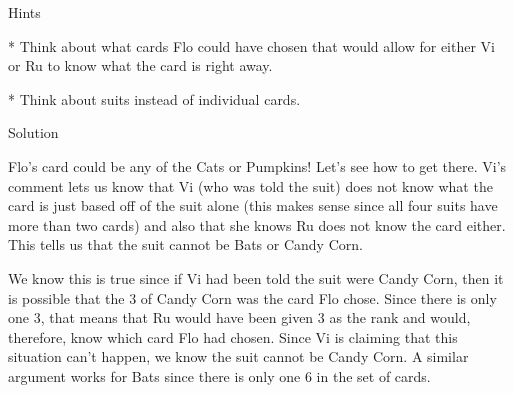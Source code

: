 

Hints

* Think about what cards Flo could have chosen that would allow for either
Vi or Ru to know what the card is right away.

* Think about suits instead of individual cards.

Solution

Flo’s card could be any of the Cats or Pumpkins! Let’s see how to get there.
Vi’s comment lets us know that Vi (who was told the suit) does not know
what the card is just based off of the suit alone (this makes sense since all four
suits have more than two cards) and also that she knows Ru does not know the
card either. This tells us that the suit cannot be Bats or Candy Corn.

We know this is true since if Vi had been told the suit were Candy Corn,
then it is possible that the 3 of Candy Corn was the card Flo chose. Since there
is only one 3, that means that Ru would have been given 3 as the rank and
would, therefore, know which card Flo had chosen. Since Vi is claiming that
this situation can’t happen, we know the suit cannot be Candy Corn. A similar
argument works for Bats since there is only one 6 in the set of cards.
